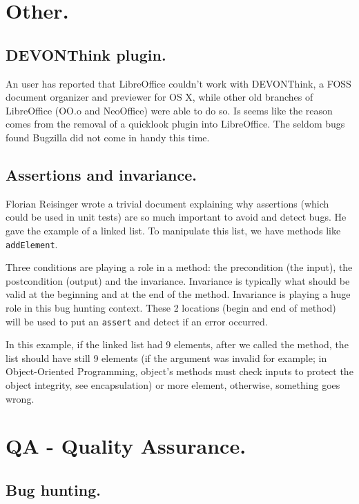 \documentclass{article}
\begin{document}
\section{Other.}

\subsection{DEVONThink plugin.}

An user has reported that LibreOffice couldn't work with DEVONThink, a FOSS document organizer and previewer for OS X, while other old branches of LibreOffice (OO.o and NeoOffice) were able to do so. Is seems like the reason comes from the removal of a quicklook plugin into LibreOffice. The seldom bugs found Bugzilla did not come in handy this time\cite{quicklookPlugin}.

\subsection{Assertions and invariance.}

Florian Reisinger wrote a trivial document explaining why assertions (which could be used in unit tests) are so much important to avoid and detect bugs. He gave the example of a linked list. To manipulate this list, we have methods like \lstinline|addElement|.

Three conditions are playing a role in a method: the precondition (the input), the postcondition (output) and the invariance. Invariance is typically what should be valid at the beginning and at the end of the method. Invariance is playing a huge role in this bug hunting context. These 2 locations (begin and end of method) will be used to put an \lstinline|assert| and detect if an error occurred.

In this example, if the linked list had 9 elements, after we called the method, the list should have still 9 elements (if the argument was invalid for example; in Object-Oriented Programming, object's methods must check inputs to protect the object integrity, see encapsulation) or more element, otherwise, something goes wrong\cite{assertionsUnitTest}.



\section{QA - Quality Assurance.}

\subsection{Bug hunting.}
\end{document}
